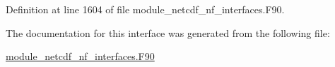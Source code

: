 Definition at line 1604 of file module\+\_\+netcdf\+\_\+nf\+\_\+interfaces.\+F90.



The documentation for this interface was generated from the following file\+:\begin{DoxyCompactItemize}
\item 
\hyperlink{module__netcdf__nf__interfaces_8F90}{module\+\_\+netcdf\+\_\+nf\+\_\+interfaces.\+F90}\end{DoxyCompactItemize}
